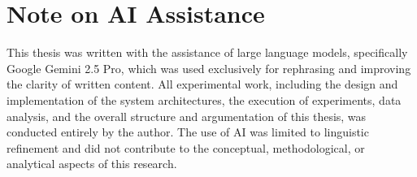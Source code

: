 \chapter*{Note on AI Assistance}

This thesis was written with the assistance of large language models, specifically Google Gemini 2.5 Pro, which was used exclusively for rephrasing and improving the clarity of written content. All experimental work, including the design and implementation of the system architectures, the execution of experiments, data analysis, and the overall structure and argumentation of this thesis, was conducted entirely by the author. The use of AI was limited to linguistic refinement and did not contribute to the conceptual, methodological, or analytical aspects of this research.
